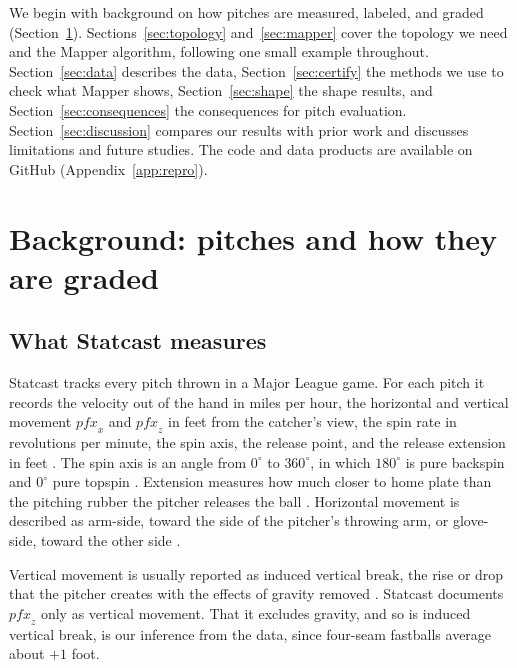 \documentclass{article}
\theoremstyle{definition}
\theoremstyle{remark}
\begin{document}
We begin with background on how pitches are measured, labeled, and graded (Section~\ref{sec:background}).
Sections~\ref{sec:topology} and~\ref{sec:mapper} cover the topology we need and the Mapper algorithm, following one small example throughout.
Section~\ref{sec:data} describes the data, Section~\ref{sec:certify} the methods we use to check what Mapper shows, Section~\ref{sec:shape} the shape results, and Section~\ref{sec:consequences} the consequences for pitch evaluation.
Section~\ref{sec:discussion} compares our results with prior work and discusses limitations and future studies.
The code and data products are available on GitHub (Appendix~\ref{app:repro}).

\section{Background: pitches and how they are graded}\label{sec:background}
\subsection{What Statcast measures}\label{sec:statcast}
Statcast tracks every pitch thrown in a Major League game.
For each pitch it records the velocity out of the hand in miles per hour, the horizontal and vertical movement $\mathit{pfx}_x$ and $\mathit{pfx}_z$ in feet from the catcher's view, the spin rate in revolutions per minute, the spin axis, the release point, and the release extension in feet \parencite{savantcsvdocs,mlbglossary_spinrate}.
The spin axis is an angle from $0^\circ$ to $360^\circ$, in which $180^\circ$ is pure backspin and $0^\circ$ pure topspin \parencite{savantcsvdocs}.
Extension measures how much closer to home plate than the pitching rubber the pitcher releases the ball \parencite{mlbglossary_extension}.
Horizontal movement is described as arm-side, toward the side of the pitcher's throwing arm, or glove-side, toward the other side \parencite{savantcsvdocs,mlbglossary_slurve}.

Vertical movement is usually reported as induced vertical break, the rise or drop that the pitcher creates with the effects of gravity removed \parencite{mlbglossary_ivb}.
Statcast documents $\mathit{pfx}_z$ only as vertical movement. That it excludes gravity, and so is induced vertical break, is our inference from the data, since four-seam fastballs average about $+1$ foot.
\end{document}
